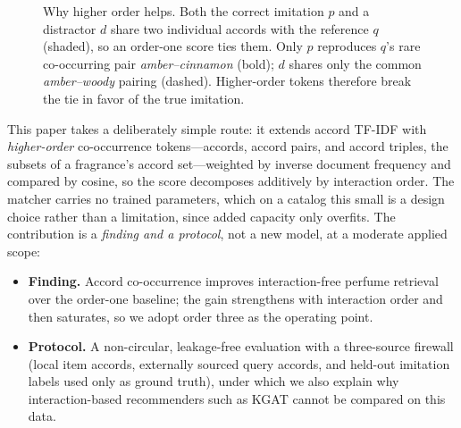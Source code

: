 \documentclass[conference]{IEEEtran}
\begin{document}
\begin{figure}[t]
\centering
{}
\caption{Why higher order helps. Both the correct imitation $p$ and a distractor $d$ share two
individual accords with the reference $q$ (shaded), so an order-one score ties them. Only $p$
reproduces $q$'s rare co-occurring pair \textit{amber--cinnamon} (bold); $d$ shares only the
common \textit{amber--woody} pairing (dashed). Higher-order tokens therefore break the tie in
favor of the true imitation.}
\label{fig:problem}
\end{figure}

This paper takes a deliberately simple route: it extends accord TF-IDF with
\emph{higher-order} co-occurrence tokens---accords, accord pairs, and accord triples, the
subsets of a fragrance's accord set---weighted by inverse document frequency and compared by
cosine, so the score decomposes additively by interaction order. The matcher carries no
trained parameters, which on a catalog this small is a design choice rather than a limitation,
since added capacity only overfits. The contribution is a \emph{finding and a protocol}, not a
new model, at a moderate applied scope:
\begin{itemize}
\item \textbf{Finding.} Accord co-occurrence improves interaction-free perfume retrieval over
the order-one baseline; the gain strengthens with interaction order and then saturates, so we
adopt order three as the operating point.
\item \textbf{Protocol.} A non-circular, leakage-free evaluation with a three-source firewall
(local item accords, externally sourced query accords, and held-out imitation labels used only
as ground truth), under which we also explain why interaction-based recommenders such as KGAT
cannot be compared on this data.
\end{itemize}
\end{document}
